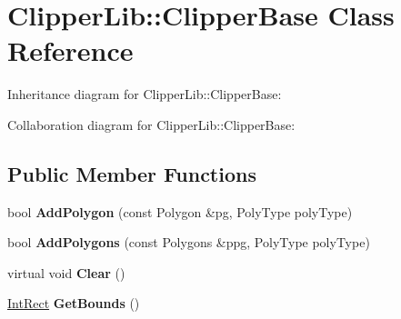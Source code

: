\hypertarget{class_clipper_lib_1_1_clipper_base}{\section{Clipper\+Lib\+:\+:Clipper\+Base Class Reference}
\label{class_clipper_lib_1_1_clipper_base}
}


Inheritance diagram for Clipper\+Lib\+:\+:Clipper\+Base\+:


Collaboration diagram for Clipper\+Lib\+:\+:Clipper\+Base\+:
\subsection*{Public Member Functions}
\begin{DoxyCompactItemize}
\item 
\hypertarget{class_clipper_lib_1_1_clipper_base_a62f7b073052eed2d0ee9af69a237badd}{bool {\bfseries Add\+Polygon} (const Polygon \&pg, Poly\+Type poly\+Type)}\label{class_clipper_lib_1_1_clipper_base_a62f7b073052eed2d0ee9af69a237badd}

\item 
\hypertarget{class_clipper_lib_1_1_clipper_base_a5cdf386f8ba72b196dec6ad0a8607bbf}{bool {\bfseries Add\+Polygons} (const Polygons \&ppg, Poly\+Type poly\+Type)}\label{class_clipper_lib_1_1_clipper_base_a5cdf386f8ba72b196dec6ad0a8607bbf}

\item 
\hypertarget{class_clipper_lib_1_1_clipper_base_a5690952fe8c2cb047025566405827821}{virtual void {\bfseries Clear} ()}\label{class_clipper_lib_1_1_clipper_base_a5690952fe8c2cb047025566405827821}

\item 
\hypertarget{class_clipper_lib_1_1_clipper_base_a5590a5454248ac3f6beeba7f9690f62e}{\hyperlink{struct_clipper_lib_1_1_int_rect}{Int\+Rect} {\bfseries Get\+Bounds} ()}\label{class_clipper_lib_1_1_clipper_base_a5590a5454248ac3f6beeba7f9690f62e}

\end{DoxyCompactItemize}
